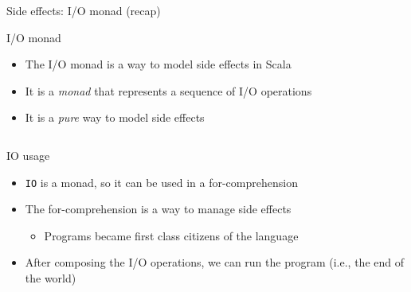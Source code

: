 \documentclass[presentation, 10pt]{beamer}\mode<presentation>{\usetheme{AMSBolognaFC}}
\begin{document}
\begin{frame}[fragile]{Side effects: I/O monad (recap)}
\begin{exampleblock}{I/O monad}
	\begin{itemize}
		\item The I/O monad is a way to model side effects in Scala
		\item It is a \emph{monad} that represents a sequence of I/O operations
		\item It is a \emph{pure} way to model side effects
	\end{itemize}
\end{exampleblock}
\inputminted[firstline=6,lastline=17]{scala}{code/src/main/scala/monads/IO.scala}
\end{frame}

\begin{frame}{IO usage}
\begin{itemize}
	\item \texttt{IO} is a monad, so it can be used in a for-comprehension
	\item The for-comprehension is a way to manage side effects
	\begin{itemize}
		\item Programs became first class citizens of the language
	\end{itemize}
	\item After composing the I/O operations, we can run the program (i.e., the end of the world)
\end{itemize}
\inputminted[firstline=42,lastline=48]{scala}{code/src/main/scala/monads/IO.scala}
\end{frame}
\end{document}
